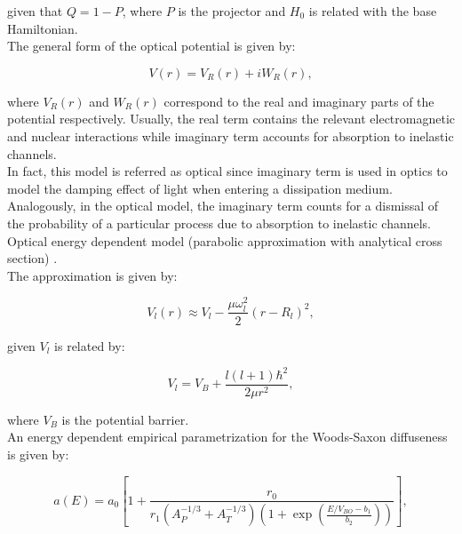 \documentclass[openany]{book}
\begin{document}
given that $Q = 1 - P$, where $P$ is the projector and $H_0$ is related with the base Hamiltonian. \\

The general form of the optical potential is given by:

\begin{equation}  \label{eq:potential_Optical}
	V(r) = V_R(r) + iW_R(r),
\end{equation}

where $V_R(r)$ and $W_R(r)$ correspond to the real and imaginary parts of the potential respectively. Usually, the real term contains the relevant electromagnetic and nuclear interactions while imaginary term accounts for absorption to inelastic channels. \\

In fact, this model is referred as optical since imaginary term is used in optics to model the damping effect of light when entering a dissipation medium. Analogously, in the optical model, the imaginary term counts for a dismissal of the probability of a particular process due to absorption to inelastic channels. \\

Optical energy dependent model (parabolic approximation with analytical cross section) \cite{singh_sukhvinder_kharab_2013B}. \\

The approximation is given by:

\begin{equation}\label{eq:potential_parabolicApproximation}
	V_l(r) \approx V_l - \frac{\mu \omega^2_l}{2}(r - R_l)^2,
\end{equation}

given $V_l$ is related by: 

\begin{equation}\label{eq:potential_parabolicApproximation_Vl}
	V_l  = V_B + \frac{l(l+1) \hbar^2}{2\mu r^2},
\end{equation}

where $V_B$ is the potential barrier. \\

An energy dependent empirical  parametrization for the Woods-Saxon diffuseness is given by:

\begin{equation}\label{eq:potential_WoodsSaxon_a_energyDependet}
	a(E) = a_0 \left[1 + \frac{r_0}{r_1(A_P^{-1/3} + A_T^{-1/3} ) (1 + \exp (\frac{E/V_{BO} - b_1}{b_2}))}\right],
\end{equation}
\end{document}
